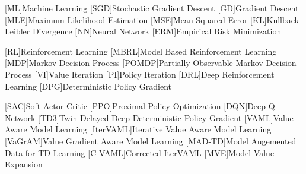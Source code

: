 [ML]{Machine Learning}
[SGD]{Stochastic Gradient Descent}
[GD]{Gradient Descent}
[MLE]{Maximum Likelihood Estimation}
[MSE]{Mean Squared Error}
[KL]{Kullback-Leibler Divergence}
[NN]{Neural Network}
[ERM]{Empirical Risk Minimization}

[RL]{Reinforcement Learning}
[MBRL]{Model Based Reinforcement Learning}
[MDP]{Markov Decision Process}
[POMDP]{Partially Observable Markov Decision Process}
[VI]{Value Iteration}
[PI]{Policy Iteration}
[DRL]{Deep Reinforcement Learning}
[DPG]{Deterministic Policy Gradient}

[SAC]{Soft Actor Critic}
[PPO]{Proximal Policy Optimization}
[DQN]{Deep Q-Network}
[TD3]{Twin Delayed Deep Deterministic Policy Gradient}
[VAML]{Value Aware Model Learning}
[IterVAML]{Iterative Value Aware Model Learning}
[VaGrAM]{Value Gradient Aware Model Learning}
[MAD-TD]{Model Augemented Data for TD Learning}
[C-VAML]{Corrected IterVAML}
[MVE]{Model Value Expansion}

